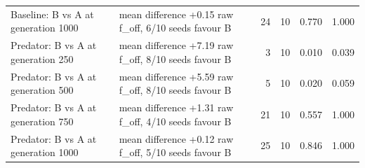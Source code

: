 \begin{table}[t]
\begin{tabular}{@{}llrrrr@{}}
    Baseline: B vs A at generation 1000 & mean difference +0.15 raw f_off, 6/10 seeds favour B & 24 & 10 & 0.770 & 1.000 \\
    Predator: B vs A at generation 250 & mean difference +7.19 raw f_off, 8/10 seeds favour B & 3 & 10 & 0.010 & 0.039 \\
    Predator: B vs A at generation 500 & mean difference +5.59 raw f_off, 8/10 seeds favour B & 5 & 10 & 0.020 & 0.059 \\
    Predator: B vs A at generation 750 & mean difference +1.31 raw f_off, 4/10 seeds favour B & 21 & 10 & 0.557 & 1.000 \\
    Predator: B vs A at generation 1000 & mean difference +0.12 raw f_off, 5/10 seeds favour B & 25 & 10 & 0.846 & 1.000 \\
    \bottomrule
  \end{tabular}
\end{table}
